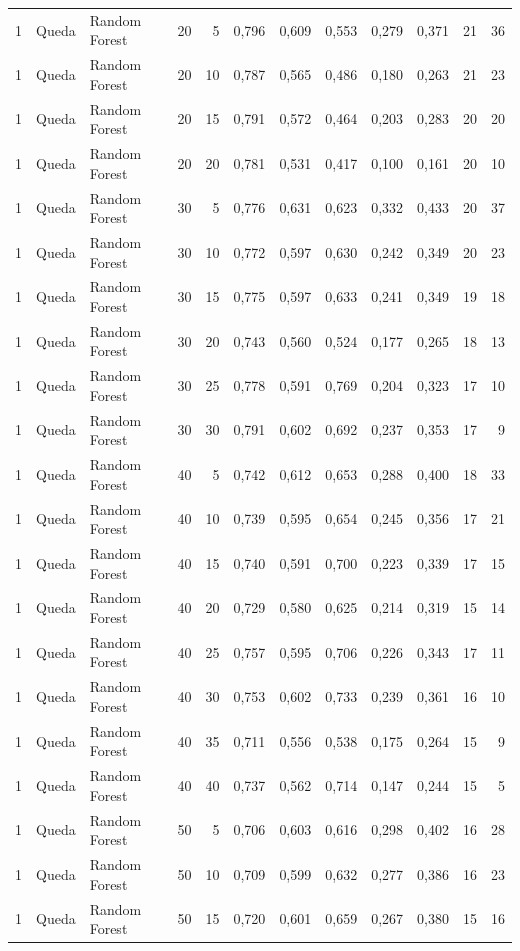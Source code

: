 \begin{longtable}{@{}rllrrrrrrrrr@{}}
1 & Queda & Random Forest & 20 & 5 & 0,796 & 0,609 & 0,553 & 0,279 & 0,371 & 21 & 36 \\
1 & Queda & Random Forest & 20 & 10 & 0,787 & 0,565 & 0,486 & 0,180 & 0,263 & 21 & 23 \\
1 & Queda & Random Forest & 20 & 15 & 0,791 & 0,572 & 0,464 & 0,203 & 0,283 & 20 & 20 \\
1 & Queda & Random Forest & 20 & 20 & 0,781 & 0,531 & 0,417 & 0,100 & 0,161 & 20 & 10 \\
1 & Queda & Random Forest & 30 & 5 & 0,776 & 0,631 & 0,623 & 0,332 & 0,433 & 20 & 37 \\
1 & Queda & Random Forest & 30 & 10 & 0,772 & 0,597 & 0,630 & 0,242 & 0,349 & 20 & 23 \\
1 & Queda & Random Forest & 30 & 15 & 0,775 & 0,597 & 0,633 & 0,241 & 0,349 & 19 & 18 \\
1 & Queda & Random Forest & 30 & 20 & 0,743 & 0,560 & 0,524 & 0,177 & 0,265 & 18 & 13 \\
1 & Queda & Random Forest & 30 & 25 & 0,778 & 0,591 & 0,769 & 0,204 & 0,323 & 17 & 10 \\
1 & Queda & Random Forest & 30 & 30 & 0,791 & 0,602 & 0,692 & 0,237 & 0,353 & 17 & 9 \\
1 & Queda & Random Forest & 40 & 5 & 0,742 & 0,612 & 0,653 & 0,288 & 0,400 & 18 & 33 \\
1 & Queda & Random Forest & 40 & 10 & 0,739 & 0,595 & 0,654 & 0,245 & 0,356 & 17 & 21 \\
1 & Queda & Random Forest & 40 & 15 & 0,740 & 0,591 & 0,700 & 0,223 & 0,339 & 17 & 15 \\
1 & Queda & Random Forest & 40 & 20 & 0,729 & 0,580 & 0,625 & 0,214 & 0,319 & 15 & 14 \\
1 & Queda & Random Forest & 40 & 25 & 0,757 & 0,595 & 0,706 & 0,226 & 0,343 & 17 & 11 \\
1 & Queda & Random Forest & 40 & 30 & 0,753 & 0,602 & 0,733 & 0,239 & 0,361 & 16 & 10 \\
1 & Queda & Random Forest & 40 & 35 & 0,711 & 0,556 & 0,538 & 0,175 & 0,264 & 15 & 9 \\
1 & Queda & Random Forest & 40 & 40 & 0,737 & 0,562 & 0,714 & 0,147 & 0,244 & 15 & 5 \\
1 & Queda & Random Forest & 50 & 5 & 0,706 & 0,603 & 0,616 & 0,298 & 0,402 & 16 & 28 \\
1 & Queda & Random Forest & 50 & 10 & 0,709 & 0,599 & 0,632 & 0,277 & 0,386 & 16 & 23 \\
1 & Queda & Random Forest & 50 & 15 & 0,720 & 0,601 & 0,659 & 0,267 & 0,380 & 15 & 16 \\

\end{longtable}

